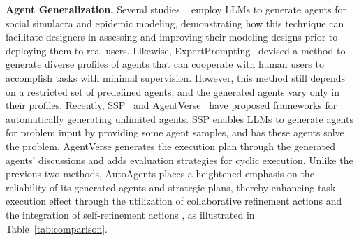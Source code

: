 \noindent
\textbf{Agent Generalization.}
Several studies ~\cite{park2022social,williams2023epidemic} employ LLMs to generate agents for social simulacra and epidemic modeling, demonstrating how this technique can facilitate designers in assessing and improving their modeling designs prior to deploying them to real users. Likewise, ExpertPrompting~\cite{xu2023expertprompting} devised a method to generate diverse profiles of agents that can cooperate with human users to accomplish tasks with minimal supervision. However, this method still depends on a restricted set of predefined agents, and the generated agents vary only in their profiles. Recently, SSP~\cite{wang2023unleashing} and AgentVerse~\cite{chen2023agentverse} have proposed frameworks for automatically generating unlimited agents. SSP enables LLMs to generate agents for problem input by providing some agent samples, and has these agents solve the problem. AgentVerse generates the execution plan through the generated agents’ discussions and adds evaluation strategies for cyclic execution. Unlike the previous two methods, AutoAgents places a heightened emphasis on the reliability of its generated agents and strategic plans, thereby enhancing task execution effect through the utilization of collaborative refinement actions and the integration of self-refinement actions
, as illustrated in Table~\ref{tab:comparison}.





